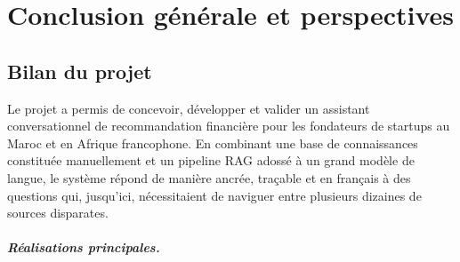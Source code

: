 \chapter{Conclusion générale et perspectives}

\section{Bilan du projet}

Le projet \tamwil{} a permis de concevoir, développer et valider un assistant conversationnel de recommandation financière pour les fondateurs de startups au Maroc et en Afrique francophone. En combinant une base de connaissances constituée manuellement et un pipeline \ac{RAG} adossé à un grand modèle de langue, le système répond de manière ancrée, traçable et en français à des questions qui, jusqu'ici, nécessitaient de naviguer entre plusieurs dizaines de sources disparates.

\paragraph{Réalisations principales.}

